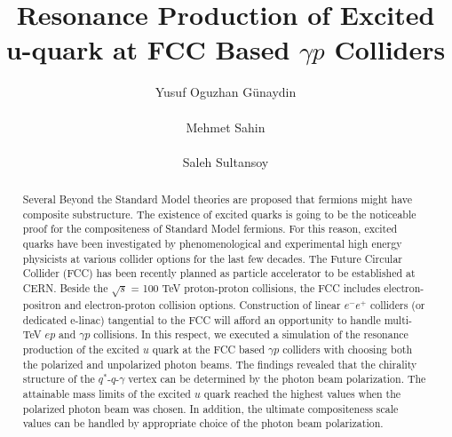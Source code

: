 \documentclass{appolb}
\begin{document}
\title{Resonance Production of  Excited u-quark at FCC Based $\gamma p$ Colliders%
}
\author{Yusuf Oguzhan G\"unaydin
\address{Department of Physics, Kahramanmaras Sutcu Imam University, Kahramanmaras, Turkey}
\\
{
}
Mehmet Sahin
\address{Department of Physics, Usak University, Usak, Turkey}
\\
{
}
Saleh Sultansoy 
\address{TOBB University of Economics and Technology, Ankara, Turkey \\ ANAS Institute of Physics, Baku, Azerbaijan}
}

\maketitle
\begin{abstract}
Several Beyond the Standard Model theories are proposed that fermions might have composite substructure. The existence of excited quarks is going to  be the noticeable proof for  the compositeness of Standard Model fermions.  For this reason, excited quarks have been investigated  by  phenomenological and experimental high energy physicists  at  various collider options for the last few decades. The Future Circular Collider (FCC) has been recently planned as particle accelerator to be established at CERN. Beside the $\sqrt{s}$ = 100 TeV proton-proton collisions, the FCC includes electron-positron and electron-proton collision options. Construction of linear $e^- e^+$ colliders (or dedicated e-linac) tangential to the FCC will afford an opportunity to handle multi-TeV $ep$ and $\gamma p$ collisions. In this respect, we executed a simulation of the resonance production of the excited $u$ quark at the FCC based $\gamma p$ colliders with choosing both  the polarized and unpolarized photon beams. The findings revealed that the  chirality structure of the $q^*$-$q$-$\gamma$ vertex can be determined by the photon beam polarization. The attainable mass limits of the excited $u$ quark reached the highest values when the polarized photon beam was chosen. In addition, the ultimate compositeness scale values can be handled by appropriate choice of  the photon beam polarization. 
\end{abstract}
  
\end{document}
